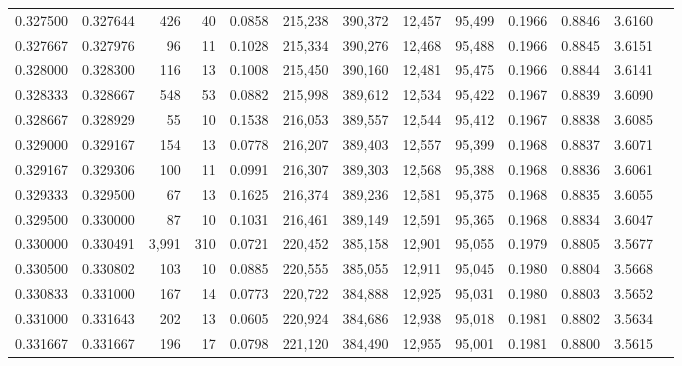 \begin{tabular}{rrrrrrrrrrrrr}
0.327500 & 0.327644 &   426 &  40 &                                     0.0858 & 215,238 & 390,372 &  12,457 &  95,499 & 0.1966 & 0.8846 & 3.6160 \\
0.327667 & 0.327976 &    96 &  11 &                                     0.1028 & 215,334 & 390,276 &  12,468 &  95,488 & 0.1966 & 0.8845 & 3.6151 \\
0.328000 & 0.328300 &   116 &  13 &                                     0.1008 & 215,450 & 390,160 &  12,481 &  95,475 & 0.1966 & 0.8844 & 3.6141 \\
0.328333 & 0.328667 &   548 &  53 &                                     0.0882 & 215,998 & 389,612 &  12,534 &  95,422 & 0.1967 & 0.8839 & 3.6090 \\
0.328667 & 0.328929 &    55 &  10 &                                     0.1538 & 216,053 & 389,557 &  12,544 &  95,412 & 0.1967 & 0.8838 & 3.6085 \\
0.329000 & 0.329167 &   154 &  13 &                                     0.0778 & 216,207 & 389,403 &  12,557 &  95,399 & 0.1968 & 0.8837 & 3.6071 \\
0.329167 & 0.329306 &   100 &  11 &                                     0.0991 & 216,307 & 389,303 &  12,568 &  95,388 & 0.1968 & 0.8836 & 3.6061 \\
0.329333 & 0.329500 &    67 &  13 &                                     0.1625 & 216,374 & 389,236 &  12,581 &  95,375 & 0.1968 & 0.8835 & 3.6055 \\
0.329500 & 0.330000 &    87 &  10 &                                     0.1031 & 216,461 & 389,149 &  12,591 &  95,365 & 0.1968 & 0.8834 & 3.6047 \\
0.330000 & 0.330491 & 3,991 & 310 &                                     0.0721 & 220,452 & 385,158 &  12,901 &  95,055 & 0.1979 & 0.8805 & 3.5677 \\
0.330500 & 0.330802 &   103 &  10 &                                     0.0885 & 220,555 & 385,055 &  12,911 &  95,045 & 0.1980 & 0.8804 & 3.5668 \\
0.330833 & 0.331000 &   167 &  14 &                                     0.0773 & 220,722 & 384,888 &  12,925 &  95,031 & 0.1980 & 0.8803 & 3.5652 \\
0.331000 & 0.331643 &   202 &  13 &                                     0.0605 & 220,924 & 384,686 &  12,938 &  95,018 & 0.1981 & 0.8802 & 3.5634 \\
0.331667 & 0.331667 &   196 &  17 &                                     0.0798 & 221,120 & 384,490 &  12,955 &  95,001 & 0.1981 & 0.8800 & 3.5615 \\

\end{tabular}
